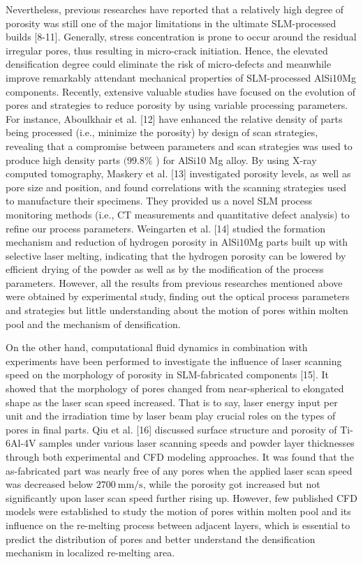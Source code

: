 \documentclass[10pt]{article}
\begin{document}
Nevertheless, previous researches have reported that a relatively high degree of porosity was still one of the major limitations in the ultimate SLM-processed builds [8-11]. Generally, stress concentration is prone to occur around the residual irregular pores, thus resulting in micro-crack initiation. Hence, the elevated densification degree could eliminate the risk of micro-defects and meanwhile improve remarkably attendant mechanical properties of SLM-processed AlSi10Mg components. Recently, extensive valuable studies have focused on the evolution of pores and strategies to reduce porosity by using variable processing parameters. For instance, Aboulkhair et al. [12] have enhanced the relative density of parts being processed (i.e., minimize the porosity) by design of scan strategies, revealing that a compromise between parameters and scan strategies was used to produce high density parts $(99.8 \%$ ) for AlSi10 Mg alloy. By using X-ray computed tomography, Maskery et al. [13] investigated porosity levels, as well as pore size and position, and found correlations with the scanning strategies used to manufacture their specimens. They provided us a novel SLM process monitoring methods (i.e., CT measurements and quantitative defect analysis) to refine our process parameters. Weingarten et al. [14] studied the formation mechanism and reduction of hydrogen porosity in $\mathrm{AlSi10Mg}$ parts built up with selective laser melting, indicating that the hydrogen porosity can be lowered by efficient drying of the powder as well as by the modification of the process parameters. However, all the results from previous researches mentioned above were obtained by experimental study, finding out the optical process parameters and strategies but little understanding about the motion of pores within molten pool and the mechanism of densification.

On the other hand, computational fluid dynamics in combination with experiments have been performed to investigate the influence of laser scanning speed on the morphology of porosity in SLM-fabricated components [15]. It showed that the morphology of pores changed from near-spherical to elongated shape as the laser scan speed increased. That is to say, laser energy input per unit and the irradiation time by laser beam play crucial roles on the types of pores in final parts. Qiu et al. [16] discussed surface structure and porosity of Ti-6Al-4V samples under various laser scanning speeds and powder layer thicknesses through both experimental and CFD modeling approaches. It was found that the as-fabricated part was nearly free of any pores when the applied laser scan speed was decreased below $2700 \mathrm{~mm} / \mathrm{s}$, while the porosity got increased but not significantly upon laser scan speed further rising up. However, few published CFD models were established to study the motion of pores within molten pool and its influence on the re-melting process between adjacent layers, which is essential to predict the distribution of pores and better understand the densification mechanism in localized re-melting area.
\end{document}
